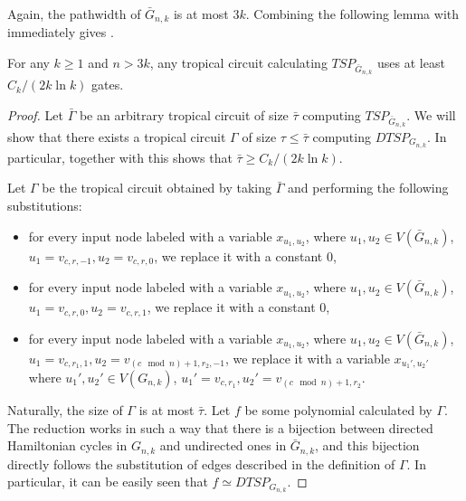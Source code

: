 Again, the pathwidth of $\bar{G}_{n, k}$ is at most $3k$.
Combining the following lemma with  immediately gives .

\begin{lemma}\label{lem:tc_tsp}
    For any $k \geq 1$ and $n > 3k$, any tropical circuit calculating $TSP_{\bar{G}_{n, k}}$ uses at least
    $C_k / (2k \ln k)$
    gates.
\end{lemma}

\begin{proof}
    Let $\bar\Gamma$ be an arbitrary tropical circuit of size $\bar\tau$ computing $TSP_{\bar{G}_{n, k}}$. We will show that there exists a tropical circuit $\Gamma$ of size $\tau \leq \bar\tau$ computing $DTSP_{G_{n, k}}$. In particular, together with  this shows that $\bar\tau \geq C_k/(2k \ln k)$.

    Let $\Gamma$ be the tropical circuit obtained by taking $\bar\Gamma$ and performing the following substitutions:
    \begin{itemize}
        \item for every input node labeled with a variable $x_{u_1, u_2}$, where $u_1, u_2 \in V(\bar{G}_{n, k})$, $u_1 = v_{c, r, -1}, u_2 = v_{c, r, 0}$, we replace it with a constant $0$,
        \item for every input node labeled with a variable $x_{u_1, u_2}$, where $u_1, u_2 \in V(\bar{G}_{n, k})$, $u_1 = v_{c, r, 0}, u_2 = v_{c, r, 1}$, we replace it with a constant $0$,
        \item for every input node labeled with a variable $x_{u_1, u_2}$, where $u_1, u_2 \in V(\bar{G}_{n, k})$, $u_1 = v_{c, r_1, 1}, u_2 = v_{(c \mod n) + 1, r_2, -1}$, we replace it with a variable $x_{u_1', u_2'}$ where $u_1', u_2' \in V(G_{n, k})$, $u_1' = v_{c, r_1}, u_2' = v_{(c \mod n) + 1, r_2}$.
    \end{itemize}
    Naturally, the size of $\Gamma$ is at most $\bar\tau$. Let $f$ be some polynomial calculated by $\Gamma$. The reduction works in such a way that there is a bijection between directed Hamiltonian cycles in $G_{n, k}$ and undirected ones in $\bar{G}_{n, k}$, and this bijection directly follows the substitution of edges described in the definition of $\Gamma$. In particular, it can be easily seen that $f \simeq DTSP_{G_{n,k}}$.

\end{proof}


